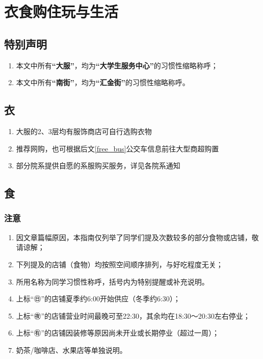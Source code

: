 \section[衣食购住玩与生活]{衣食购住玩与生活}

\subsection*{特别声明}
\begin{enumerate}
    \item 本文中所有\textbf{“大服”}，均为\textbf{“大学生服务中心”}的习惯性缩略称呼；
    \item 本文中所有\textbf{“南街”}，均为\textbf{“汇金街”}的习惯性缩略称呼。
\end{enumerate}
\subsection[衣]{衣}
\begin{enumerate}
    \item 大服的2、3层均有服饰商店可自行选购衣物
    \item 推荐网购，也可根据后文\uline{\ref{free_bus}}公交车信息前往大型商超购置
    \item 部分院系提供自愿的系服购买服务，详见各院系通知
\end{enumerate}

\subsection[食]{食}
\subsubsection*{注意}
\begin{enumerate}
    \item 因文章篇幅原因，本指南仅列举了同学们提及次数较多的部分食物或店铺，敬请谅解；
    \item 下列提及的店铺（食物）均按照空间顺序排列，与好吃程度无关；
    \item 所用名称为同学习惯性称呼，括号内为特别提醒或补充说明。
    \item 上标“㊐”的店铺夏季约6:00开始供应（冬季约6:30）；
    \item 上标“㊰”的店铺营业时间最晚可至22:30，其余均在18:30～20:30左右停业；
    \item 上标“㊒”的店铺因装修等原因尚未开业或长期停业（超过一周）；
    \item 奶茶/咖啡店、水果店等单独说明。
\end{enumerate}

